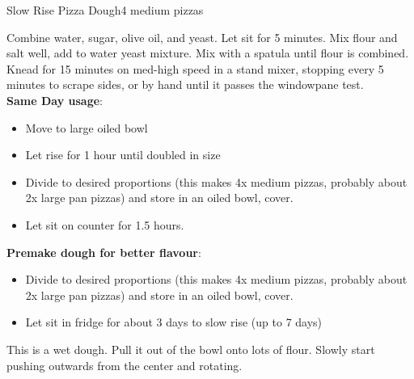 \begin{recipe}{Slow Rise Pizza Dough}{4 medium pizzas}{}


    Combine water, sugar,  olive oil, and yeast. Let sit for 5 minutes. Mix flour and salt well, add to water yeast mixture. Mix with a spatula until flour is combined. Knead for 15 minutes on med-high speed in a stand mixer, stopping every 5 minutes to scrape sides,  or by hand until it passes the windowpane test.\\

    \textbf{Same Day usage}:
    \begin{itemize}
        \item Move to large oiled bowl
        \item Let rise for 1 hour until doubled in size
        \item Divide to desired proportions (this makes 4x medium pizzas, probably about 2x large pan pizzas) and store in an oiled bowl, cover.
        \item Let sit on counter for 1.5 hours.
    \end{itemize}
    \textbf{Premake dough for better flavour}:
    \begin{itemize}
        \item Divide to desired proportions (this makes 4x medium pizzas, probably about 2x large pan pizzas) and store in an oiled bowl, cover.
        \item Let sit in fridge for about 3 days to slow rise (up to 7 days)
    \end{itemize}

    This is a wet dough. Pull it out of the bowl onto lots of flour. Slowly start pushing outwards from the center and rotating.
\end{recipe}